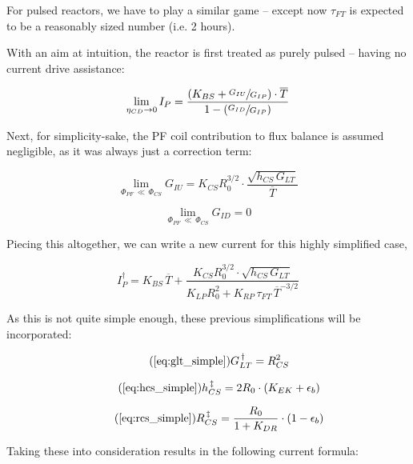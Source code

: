 For pulsed reactors, we have to play a similar game -- except now $\tau_{FT}$ is expected to be a reasonably sized number (i.e. 2 hours).

With an aim at intuition, the reactor is first treated as purely pulsed -- having no current drive assistance:

\begin{equation}
	\lim_{\eta_{CD} \to 0} I_P = \frac{ \left( K_{BS} + \sfrac{ G_{IU} }{ G_{IP} } \right) \cdot \overline T }{ 1 - \left( \sfrac{ G_{ID} }{ G_{IP} } \right) }
\end{equation}

Next, for simplicity-sake, the PF coil contribution to flux balance is assumed negligible, as it was always just a correction term:

\begin{equation}
	\lim_{ \Phi_{PF} \, \ll \, \Phi_{CS} } G_{IU} = K_{CS} R_0^{3/2} \cdot \frac{ \sqrt{ h_{CS} \, G_{LT} } }{ \overline T }
\end{equation}

\begin{equation}
	\lim_{ \Phi_{PF} \, \ll \, \Phi_{CS} } G_{ID} = 0
\end{equation}

Piecing this altogether, we can write a new current for this highly simplified case, 

\begin{equation}
	I_P^\dagger = K_{BS} \, \overline T + \frac{ K_{CS} R_0^{3/2} \cdot \sqrt{ h_{CS} \, G_{LT} } }{ K_{LP} R_0^2 + K_{RP} \, \tau_{FT} \, \overline T ^ {-3/2} }
\end{equation}

As this is not quite simple enough, these previous simplifications will be incorporated:

\begin{equation}
	\tag{\ref{eq:glt_simple}}
	G_{LT}^{\,\dagger} = R_{CS}^2
\end{equation}

\begin{equation}
	\tag{\ref{eq:hcs_simple}}
	h_{CS}^{\,\ddagger} = 2 R_0 \cdot \left( K_{EK} + \epsilon_b \right) 
\end{equation}

\begin{equation}
	\tag{\ref{eq:rcs_simple}}
	R_{CS}^{\,\ddagger} = \frac{ R_0 }{ 1 + K_{DR} } \cdot \left( 1 - \epsilon_b  \right)
\end{equation}

Taking these into consideration results in the following current formula:

